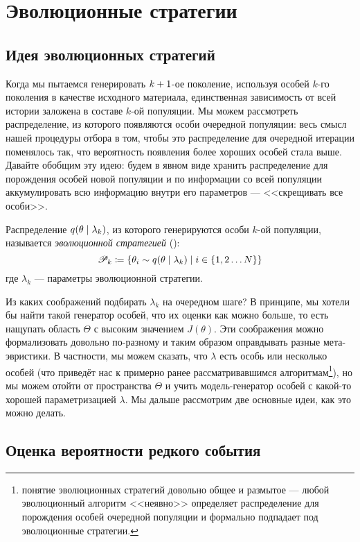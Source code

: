 \section{Эволюционные стратегии}

\subsection{Идея эволюционных стратегий}

Когда мы пытаемся генерировать $k \HM+ 1$-ое поколение, используя особей $k$-го поколения в качестве исходного материала, единственная зависимость от всей истории заложена в составе $k$-ой популяции. Мы можем рассмотреть распределение, из которого появляются особи очередной популяции: весь смысл нашей процедуры отбора в том, чтобы это распределение для очередной итерации поменялось так, что вероятность появления более хороших особей стала выше. Давайте обобщим эту идею: будем в явном виде хранить распределение для порождения особей новой популяции и по информации со всей популяции аккумулировать всю информацию внутри его параметров --- <<скрещивать все особи>>.

\begin{definition}
Распределение $q(\theta \HM\mid \lambda_k)$, из которого генерируются особи $k$-ой популяции, называется \emph{эволюционной стратегией} ():
$$\Pop_{k} \coloneqq \{\theta_i \sim q(\theta \HM\mid \lambda_k) \mid i \in \{1, 2 \dots N\} \}$$
где $\lambda_k$ --- параметры эволюционной стратегии.
\end{definition}

Из каких соображений подбирать $\lambda_k$ на очередном шаге? В принципе, мы хотели бы найти такой генератор особей, что их оценки как можно больше, то есть нащупать область $\Theta$ с высоким значением $J(\theta)$. Эти соображения можно формализовать довольно по-разному и таким образом оправдывать разные мета-эвристики. В частности, мы можем сказать, что $\lambda$ есть особь или несколько особей (что приведёт нас к примерно ранее рассматривавшимся алгоритмам\footnote{понятие эволюционных стратегий довольно общее и размытое --- любой эволюционный алгоритм <<неявно>> определяет распределение для порождения особей очередной популяции и формально подпадает под эволюционные стратегии.}), но мы можем отойти от пространства $\Theta$ и учить модель-генератор особей с какой-то хорошей параметризацией $\lambda$. Мы дальше рассмотрим две основные идеи, как это можно делать.

\subsection{Оценка вероятности редкого события}

